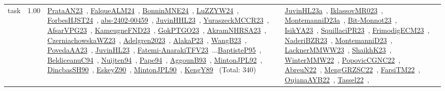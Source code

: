 {\begin{longtable}{p{3cm}r>{\raggedright\arraybackslash}p{6cm}>{\raggedright\arraybackslash}p{6cm}>{\raggedright\arraybackslash}p{8cm}}
\index{task}\index{Scheduling!task}task &  1.00 & \href{../works/PrataAN23.pdf}{PrataAN23}~\cite{PrataAN23}, \href{../works/FalqueALM24.pdf}{FalqueALM24}~\cite{FalqueALM24}, \href{../works/BonninMNE24.pdf}{BonninMNE24}~\cite{BonninMNE24}, \href{../works/LuZZYW24.pdf}{LuZZYW24}~\cite{LuZZYW24}, \href{../works/ForbesHJST24.pdf}{ForbesHJST24}~\cite{ForbesHJST24}, \href{../works/abs-2402-00459.pdf}{abs-2402-00459}~\cite{abs-2402-00459}, \href{../works/JuvinHHL23.pdf}{JuvinHHL23}~\cite{JuvinHHL23}, \href{../works/YuraszeckMCCR23.pdf}{YuraszeckMCCR23}~\cite{YuraszeckMCCR23}, \href{../works/AfsarVPG23.pdf}{AfsarVPG23}~\cite{AfsarVPG23}, \href{../works/KameugneFND23.pdf}{KameugneFND23}~\cite{KameugneFND23}, \href{../works/GokPTGO23.pdf}{GokPTGO23}~\cite{GokPTGO23}, \href{../works/AkramNHRSA23.pdf}{AkramNHRSA23}~\cite{AkramNHRSA23}, \href{../works/CzerniachowskaWZ23.pdf}{CzerniachowskaWZ23}~\cite{CzerniachowskaWZ23}, \href{../works/Adelgren2023.pdf}{Adelgren2023}~\cite{Adelgren2023}, \href{../works/AlakaP23.pdf}{AlakaP23}~\cite{AlakaP23}, \href{../works/WangB23.pdf}{WangB23}~\cite{WangB23}, \href{../works/PovedaAA23.pdf}{PovedaAA23}~\cite{PovedaAA23}, \href{../works/JuvinHL23.pdf}{JuvinHL23}~\cite{JuvinHL23}, \href{../works/Fatemi-AnarakiTFV23.pdf}{Fatemi-AnarakiTFV23}~\cite{Fatemi-AnarakiTFV23}...\href{../works/BaptisteP95.pdf}{BaptisteP95}~\cite{BaptisteP95}, \href{../works/BeldiceanuC94.pdf}{BeldiceanuC94}~\cite{BeldiceanuC94}, \href{../works/Nuijten94.pdf}{Nuijten94}~\cite{Nuijten94}, \href{../works/Pape94.pdf}{Pape94}~\cite{Pape94}, \href{../works/AggounB93.pdf}{AggounB93}~\cite{AggounB93}, \href{../works/MintonJPL92.pdf}{MintonJPL92}~\cite{MintonJPL92}, \href{../works/DincbasSH90.pdf}{DincbasSH90}~\cite{DincbasSH90}, \href{../works/EskeyZ90.pdf}{EskeyZ90}~\cite{EskeyZ90}, \href{../works/MintonJPL90.pdf}{MintonJPL90}~\cite{MintonJPL90}, \href{../works/KengY89.pdf}{KengY89}~\cite{KengY89} (Total: 340) & \href{../works/JuvinHL23a.pdf}{JuvinHL23a}~\cite{JuvinHL23a}, \href{../works/IklassovMR023.pdf}{IklassovMR023}~\cite{IklassovMR023}, \href{../works/MontemanniD23a.pdf}{MontemanniD23a}~\cite{MontemanniD23a}, \href{../works/Bit-Monnot23.pdf}{Bit-Monnot23}~\cite{Bit-Monnot23}, \href{../works/IsikYA23.pdf}{IsikYA23}~\cite{IsikYA23}, \href{../works/SquillaciPR23.pdf}{SquillaciPR23}~\cite{SquillaciPR23}, \href{../works/FrimodigECM23.pdf}{FrimodigECM23}~\cite{FrimodigECM23}, \href{../works/NaderiBZR23.pdf}{NaderiBZR23}~\cite{NaderiBZR23}, \href{../works/MontemanniD23.pdf}{MontemanniD23}~\cite{MontemanniD23}, \href{../works/LacknerMMWW23.pdf}{LacknerMMWW23}~\cite{LacknerMMWW23}, \href{../works/ShaikhK23.pdf}{ShaikhK23}~\cite{ShaikhK23}, \href{../works/WinterMMW22.pdf}{WinterMMW22}~\cite{WinterMMW22}, \href{../works/PopovicCGNC22.pdf}{PopovicCGNC22}~\cite{PopovicCGNC22}, \href{../works/AbreuN22.pdf}{AbreuN22}~\cite{AbreuN22}, \href{../works/MengGRZSC22.pdf}{MengGRZSC22}~\cite{MengGRZSC22}, \href{../works/FarsiTM22.pdf}{FarsiTM22}~\cite{FarsiTM22}, \href{../works/OujanaAYB22.pdf}{OujanaAYB22}~\cite{OujanaAYB22}, \href{../works/Tassel22.pdf}{Tassel22}~\cite{Tassel22}, 
\end{longtable}}
